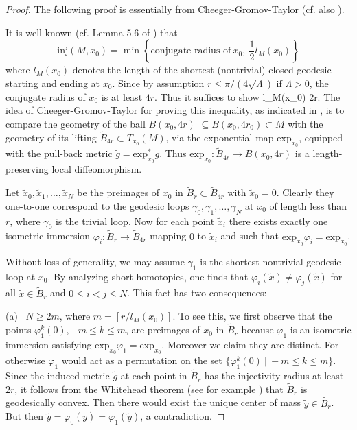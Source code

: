 \begin{proof} The following proof is essentially from Cheeger-Gromov-Taylor \cite{CGT}
(cf. also \cite{AM}).

It is well known (cf. Lemma 5.6 of \cite{CE}) that
$$
\mbox{inj}(M, x_0)=\min \left\{\mbox{conjugate radius of}\ x_0, \
\frac {1}{2}l_M(x_0)\right\}
$$
where $l_M(x_0)$ denotes the length of the shortest (nontrivial)
closed geodesic starting and ending at $x_0$. Since by assumption
$r\le \pi/(4\sqrt{\Lambda})$ if $\Lambda>0$, the conjugate radius
of $x_0$ is at least $4r$. Thus it suffices to show \be
l_M(x_0)\geq
2r\cdot{}.
\ee The idea of Cheeger-Gromov-Taylor \cite{CGT} for proving this
inequality, as indicated in \cite{AM}, is to compare the geometry of
the ball $B(x_0,4r)$ $\subseteq B(x_0, 4r_0)\subset M$ with the
geometry of its lifting $\tilde B_{4r}\subset T_{x_0}(M)$, via the
exponential map $\mbox{exp}_{x_0}$, equipped with the pull-back
metric $\tilde g=\mbox{exp}^{*}_{x_0} g$. Thus $\mbox{exp}_{x_0}:
\tilde B_{4r} \to B(x_0,4r)$ is a length-preserving local
diffeomorphism.

Let $\tilde x_0, \tilde x_1, \ldots, \tilde x_N$ be the preimages
of $x_0$ in $\tilde B_r\subset \tilde B_{4r}$ with $\tilde x_0=0$.
Clearly they one-to-one correspond to the geodesic loops
$\gamma_0, \gamma_1, \ldots, \gamma_N$ at $x_0$ of length less
than $r$, where $\gamma_0$ is the trivial loop. Now for each point
$\tilde x_i$ there exists exactly one isometric immersion
$\varphi_i : \tilde B_r \to \tilde B_{4r}$ mapping $0$ to $\tilde
x_i$ and such that $\mbox{exp}_{x_0} \varphi_i=\mbox{exp}_{x_0}$.

Without loss of generality, we may assume $\gamma_1$ is the
shortest nontrivial geodesic loop at $x_0$. By analyzing short
homotopies, one finds that $\varphi_i(\tilde x)\neq
\varphi_j(\tilde x)$ for all $\tilde x\in \tilde B_r$ and $0\le
i<j\le N$. This fact has two consequences:

\medskip
(a) \ $N\ge 2m$, where $m=[r/l_M(x_0)]$. To see this, we first
observe that the points $\varphi_1^k(0), -m\le k\le m$, are
preimages of $x_0$ in $\tilde B_r$ because $\varphi_1$ is an
isometric immersion satisfying $\mbox{exp}_{x_0}
\varphi_1=\mbox{exp}_{x_0}$. Moreover we claim they are distinct.
For otherwise $\varphi_1$ would act as a permutation on the set
$\{\varphi_1^k(0)\ |\ -m\le k\le m\}$. Since the induced metric
$\tilde g$ at each point in $\tilde B_r$ has the injectivity
radius at least $2r$, it follows from the Whitehead theorem (see
for example \cite{CE}) that $\tilde B_r$ is geodesically convex.
Then there would exist the unique center of mass $\tilde y \in
\tilde{B_r}$. But then $\tilde y=\varphi_0(\tilde
y)=\varphi_1(\tilde y)$, a contradiction.


\end{proof}
